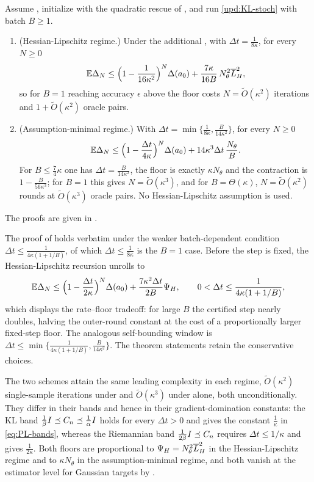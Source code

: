 \begin{theorem}
\label{thm:stoch-glob-KL}
Assume , initialize with the quadratic rescue of , and run
\eqref{upd:KL-stoch} with batch $B\geq1$.
\begin{enumerate}
\item \textup{(Hessian-Lipschitz regime.)} Under the additional , with
$\Delta t=\tfrac1{8\kappa}$, for every $N\geq0$
\[
    \mathbb{E}\Delta_N\leq\Bigl(1-\frac1{16\kappa^2}\Bigr)^N\Delta(a_0)+\frac{7\kappa}{16B}\,N_\theta^2\overline{L}_H^2 ,
\]
so for $B=1$ reaching accuracy $\epsilon$ above the floor costs $N=\widetilde O(\kappa^2)$ iterations
and $1+\widetilde O(\kappa^2)$ oracle pairs.
\item \textup{(Assumption-minimal regime.)} With $\Delta t=\min\{\tfrac1{8\kappa},\tfrac B{14\kappa^2}\}$,
for every $N\geq0$
\[
    \mathbb{E}\Delta_N\leq\Bigl(1-\frac{\Delta t}{4\kappa}\Bigr)^N\Delta(a_0)+14\kappa^3\Delta t\,\frac{N_\theta}B .
\]
For $B\leq\tfrac74\kappa$ one has $\Delta t=\tfrac B{14\kappa^2}$, the floor is exactly $\kappa N_\theta$
and the contraction is $1-\tfrac B{56\kappa^3}$; for $B=1$ this gives $N=\widetilde O(\kappa^3)$, and
for $B=\Theta(\kappa)$, $N=\widetilde O(\kappa^2)$ rounds at $\widetilde O(\kappa^3)$ oracle pairs. No
Hessian-Lipschitz assumption is used.
\end{enumerate}
\end{theorem}

The proofs are given in .

The proof of  holds verbatim under the weaker batch-dependent condition
$\Delta t\leq\tfrac1{4\kappa(1+1/B)}$, of which $\Delta t\leq\tfrac1{8\kappa}$ is the $B=1$ case.
Before the step is fixed, the Hessian-Lipschitz recursion unrolls to
\[
    \mathbb{E}\Delta_N\leq\Bigl(1-\frac{\Delta t}{2\kappa}\Bigr)^N\Delta(a_0)+\frac{7\kappa^2\Delta t}{2B}\Psi_H,
    \qquad 0<\Delta t\leq\frac1{4\kappa(1+1/B)},
\]
which displays the rate--floor tradeoff: for large $B$ the certified step nearly doubles, halving the
outer-round constant at the cost of a proportionally larger fixed-step floor. The analogous
self-bounding window is $\Delta t\leq\min\{\tfrac1{4\kappa(1+1/B)},\tfrac B{14\kappa^2}\}$. The theorem
statements retain the conservative choices.

The two schemes attain the same leading complexity in each regime, $\widetilde O(\kappa^2)$
single-sample iterations under  and $\widetilde O(\kappa^3)$ under
 alone, both unconditionally. They differ in their bands and hence in
their gradient-domination constants: the KL band $\tfrac1\beta I\preceq C_n\preceq\tfrac1\alpha I$
holds for every $\Delta t>0$ and gives the constant $\tfrac1\kappa$ in \eqref{eq:PL-bands}, whereas the
Riemannian band $\tfrac1{2\beta}I\preceq C_n$ requires $\Delta t\leq1/\kappa$ and gives
$\tfrac1{2\kappa}$. Both floors are proportional to $\Psi_H=N_\theta^2\overline{L}_H^2$ in the
Hessian-Lipschitz regime and to $\kappa N_\theta$ in the assumption-minimal regime, and both vanish at
the estimator level for Gaussian targets by .

